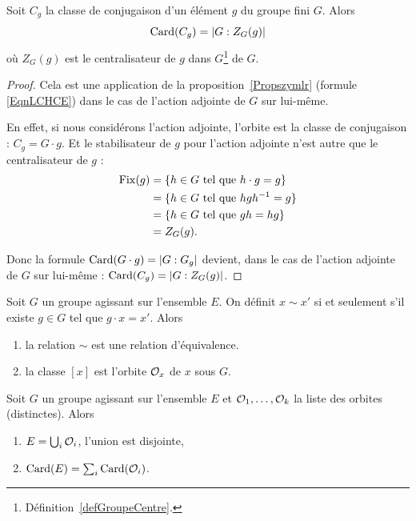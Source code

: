 \begin{corollary}       \label{CORooRRVHooTyCjZZ}
    Soit \( C_g\) la classe de conjugaison d'un élément  \( g\) du groupe fini \( G\). Alors
    \begin{equation}
        \operatorname{Card}(C_g)=| G:Z_G(g) |
    \end{equation}
    où $Z_G(g)$ est le centralisateur de \( g\) dans \( G\)\footnote{Définition~\ref{defGroupeCentre}.} de \( G\).
\end{corollary}

\begin{proof}
    Cela est une application de la proposition~\ref{Propszymlr} (formule \eqref{EqnLCHCE}) dans le cas de l'action adjointe de \( G\) sur lui-même.

    En effet, si nous considérons l'action adjointe, l'orbite est la classe de conjugaison : \( C_g=G\cdot g\). Et le stabilisateur de \( g\) pour l'action adjointe n'est autre que le centralisateur de \( g\) :
    \begin{subequations}
        \begin{align}
        \operatorname{Fix}(g)&=\{ h\in G\text{ tel que } h\cdot g=g \}\\
        &= \{ h\in G\text{ tel que } hgh^{-1}=g \}\\
        &=\{ h\in G\text{ tel que } gh=hg \}\\
        &=Z_G(g).
        \end{align}
    \end{subequations}

    Donc la formule \( \operatorname{Card}(G\cdot g)=| G:G_g |\) devient, dans le cas de l'action adjointe de \( G\) sur lui-même : \( \operatorname{Card}(C_g)=| G:Z_G(g) |\).
\end{proof}

\begin{lemma}
    Soit \( G\) un groupe agissant sur l'ensemble \( E\). On définit \( x\sim x'\) si et seulement s'il existe \( g\in G\) tel que \( g\cdot x=x'\). Alors
    \begin{enumerate}
        \item
            la relation \( \sim\) est une relation d'équivalence.
        \item
            la classe \( [x]\) est l'orbite \( \mathcal{O}_x\) de \( x\) sous \( G\).
    \end{enumerate}
\end{lemma}

\begin{corollary} \label{CorARFVMP}
    Soit \( G\) un groupe agissant sur l'ensemble \( E\) et \( \mathcal{O}_1,\ldots, \mathcal{O}_k  \) la liste des orbites (distinctes). Alors
    \begin{enumerate}
        \item
            \( E=\bigcup_i\mathcal{O}_i\), l'union est disjointe,
        \item
            \( \operatorname{Card}(E)=\sum_i\operatorname{Card}(\mathcal{O}_i)\).
    \end{enumerate}
\end{corollary}

